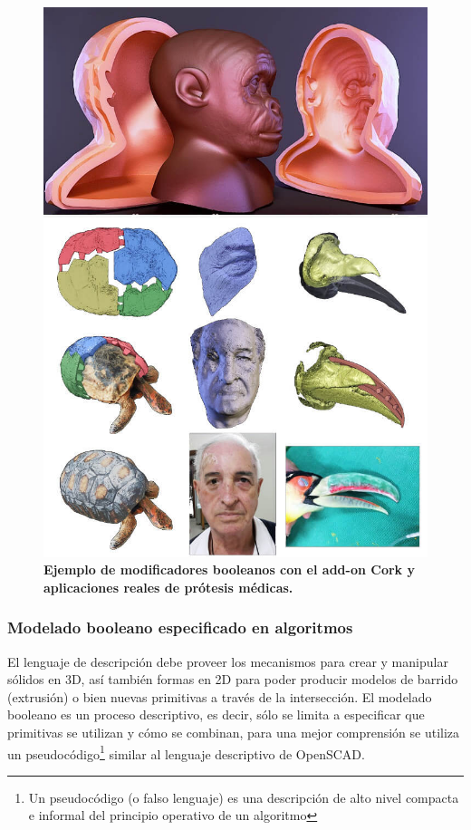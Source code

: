 \begin{figure}[h]
\includegraphics[width=12cm]{Img/Modelos/corkc.jpg}
\centering
\caption{\textbf{ \footnotesize{Ejemplo de modificadores booleanos con el add-on Cork y aplicaciones reales de prótesis médicas.   }}}
\label{fig:cork}
\end{figure}





\clearpage
\subsubsection{Modelado booleano especificado en algoritmos}

El lenguaje de descripción debe proveer los mecanismos para crear y manipular sólidos en 3D, así también formas en 2D para poder producir modelos de barrido (extrusión) o bien nuevas primitivas a través de la intersección. El  modelado  booleano  es  un proceso  descriptivo,  es  decir,  sólo  se limita  a  especificar que primitivas se utilizan y cómo se combinan, para una mejor comprensión se utiliza un pseudocódigo\footnote{Un pseudocódigo (o falso lenguaje) es una descripción de alto nivel compacta e informal del principio operativo de un algoritmo} similar al lenguaje descriptivo de OpenSCAD.

